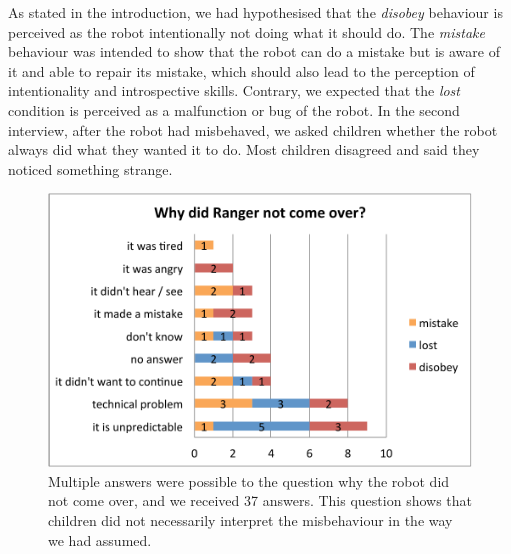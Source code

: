 \documentclass{sig-alternate}
\begin{document}
As stated in the introduction, we had hypothesised that the \textit{disobey}
behaviour is perceived as the robot intentionally not doing what it should do.
The \textit{mistake} behaviour was intended to show that the robot can do a
mistake but is aware of it and able to repair its mistake, which should also
lead to the perception of intentionality and introspective skills.  Contrary, we expected that the
\textit{lost} condition is perceived as a malfunction or bug of the robot.  In
the second interview, after the robot had misbehaved, we asked children whether
the robot always did what they wanted it to do. Most children disagreed and said
they noticed something strange.

\begin{figure}[!h]
    \centering
    \includegraphics[width=0.8\linewidth]{domino-why-misbehavior.pdf}   
    \caption[Why Did the Robot Misbehave?]{\small Multiple answers were possible
    to the question why the robot did not come over, and we received 37 answers.
    This question shows that children did not necessarily interpret the misbehaviour
    in the way we had assumed.}

    \label{fig:domino-why-misbehaviour}
\end{figure}	
\end{document}
